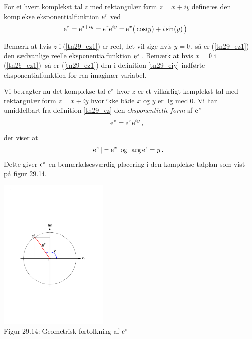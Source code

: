 \begin{definition}\label{tn29_ez}
For et hvert komplekst tal $z$ med rektangulær form $z=x+iy$ defineres den komplekse eksponentialfunktion $\mathrm{e}^z$ ved
\begin{equation}\label{tn29_ez1}
\mathrm{e}^z=\mathrm{e}^{x+iy}=\mathrm{e}^x\mathrm{e}^{iy}=\mathrm{e}^x\big(\cos(y)+i\sin(y)\,\big)\,.
\end{equation}
\end{definition}

\begin{aha}
Bemærk at hvis $z$ i (\ref{tn29_ez1}) er reel, det vil sige hvis $y=0\,$, så er (\ref{tn29_ez1}) den sædvanlige reelle eksponentialfunktion $\mathrm{e}^x\,.$\bs
Bemærk at hvis $x=0$ i (\ref{tn29_ez1}), så er (\ref{tn29_ez1}) den i definition \ref{tn29_eiy} indførte eksponentialfunktion for ren imaginær variabel.
\end{aha}

Vi betragter nu det komplekse tal $\mathrm{e}^z$ hvor $z$ er et vilkårligt komplekst tal med rektangulær form $z=x+iy$ hvor ikke både $x$ og $y$ er lig med $0$. Vi har umiddelbart fra definition \ref{tn29_ez} den \textit{eksponentielle form} af $\mathrm{e}^z\,$
$$
\mathrm{e}^z=\mathrm{e}^x\mathrm{e}^{iy}\,,
$$
der viser at
$$
|\,\mathrm{e}^z\,|=\mathrm{e}^x\,\,\,\mathrm{og} \,\,\,\arg{\mathrm{e}^z}=y\,.
$$ 
Dette giver $\mathrm{e}^z$ en bemærkelsesværdig placering i den komplekse talplan som vist på figur 29.14.

\begin{center}
	\includegraphics[trim=3cm 7.5cm 3cm 9cm,width=0.4\textwidth,clip]{Geometer/eksponentielForm2.pdf}\\
Figur 29.14: Geometrisk fortolkning af $\mathrm{e}^z$
\end{center}

